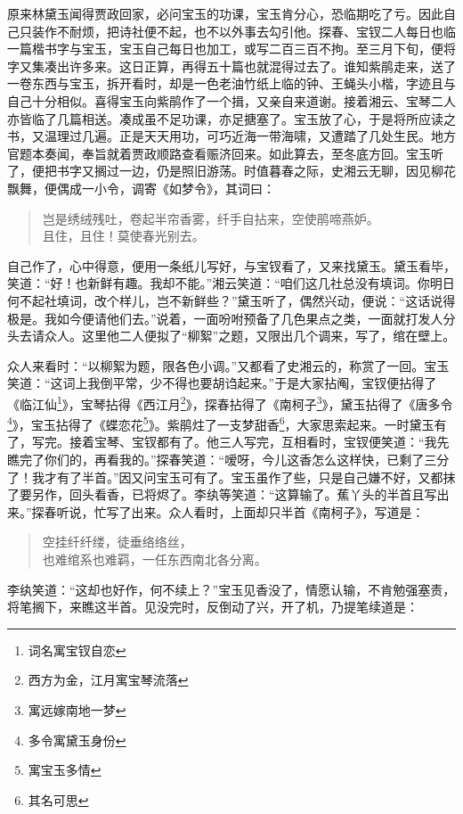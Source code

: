 \documentclass[12pt,oneside]{book}
\newenvironment{shici}{%
\begin{verse}%
\centering\large\hspace{12pt}}%
{\end{verse}}
\begin{document}
原来林黛玉闻得贾政回家，必问宝玉的功课，宝玉肯分心，恐临期吃了亏。因此自己只装作不耐烦，把诗社便不起，也不以外事去勾引他。探春、宝钗二人每日也临一篇楷书字与宝玉，宝玉自己每日也加工，或写二百三百不拘。至三月下旬，便将字又集凑出许多来。这日正算，再得五十篇也就混得过去了。谁知紫鹃走来，送了一卷东西与宝玉，拆开看时，却是一色老油竹纸上临的钟、王蝇头小楷，字迹且与自己十分相似。喜得宝玉向紫鹃作了一个揖，又亲自来道谢。接着湘云、宝琴二人亦皆临了几篇相送。凑成虽不足功课，亦足搪塞了。宝玉放了心，于是将所应读之书，又温理过几遍。正是天天用功，可巧近海一带海啸，又遭踏了几处生民。地方官题本奏闻，奉旨就着贾政顺路查看赈济回来。如此算去，至冬底方回。宝玉听了，便把书字又搁过一边，仍是照旧游荡。时值暮春之际，史湘云无聊，因见柳花飘舞，便偶成一小令，调寄《如梦令》，其词曰：

\begin{shici}
岂是绣绒残吐，卷起半帘香雾，纤手自拈来，空使鹃啼燕妒。\\
且住，且住！莫使春光别去。
\end{shici}


自己作了，心中得意，便用一条纸儿写好，与宝钗看了，又来找黛玉。黛玉看毕，笑道：“好！也新鲜有趣。我却不能。”湘云笑道：“咱们这几社总没有填词。你明日何不起社填词，改个样儿，岂不新鲜些？”黛玉听了，偶然兴动，便说：“这话说得极是。我如今便请他们去。”说着，一面吩咐预备了几色果点之类，一面就打发人分头去请众人。这里他二人便拟了“柳絮”之题，又限出几个调来，写了，绾在壁上。

众人来看时：“以柳絮为题，限各色小调。”又都看了史湘云的，称赏了一回。宝玉笑道：“这词上我倒平常，少不得也要胡诌起来。”于是大家拈阄，宝钗便拈得了《临江仙\footnote{词名寓宝钗自恋}》，宝琴拈得《西江月\footnote{西方为金，江月寓宝琴流落}》，探春拈得了《南柯子\footnote{寓远嫁南地一梦}》，黛玉拈得了《唐多令\footnote{多令寓黛玉身份}》，宝玉拈得了《蝶恋花\footnote{寓宝玉多情}》。紫鹃炷了一支梦甜香\footnote{其名可思}，大家思索起来。一时黛玉有了，写完。接着宝琴、宝钗都有了。他三人写完，互相看时，宝钗便笑道：“我先瞧完了你们的，再看我的。”探春笑道：“嗳呀，今儿这香怎么这样快，已剩了三分了！我才有了半首。”因又问宝玉可有了。宝玉虽作了些，只是自己嫌不好，又都抹了要另作，回头看香，已将烬了。李纨等笑道：“这算输了。蕉丫头的半首且写出来。”探春听说，忙写了出来。众人看时，上面却只半首《南柯子》，写道是：

\begin{shici}
空挂纤纤缕，徒垂络络丝，\\
也难绾系也难羁，一任东西南北各分离。
\end{shici}


李纨笑道：“这却也好作，何不续上？”宝玉见香没了，情愿认输，不肯勉强塞责，将笔搁下，来瞧这半首。见没完时，反倒动了兴，开了机，乃提笔续道是：
\end{document}
